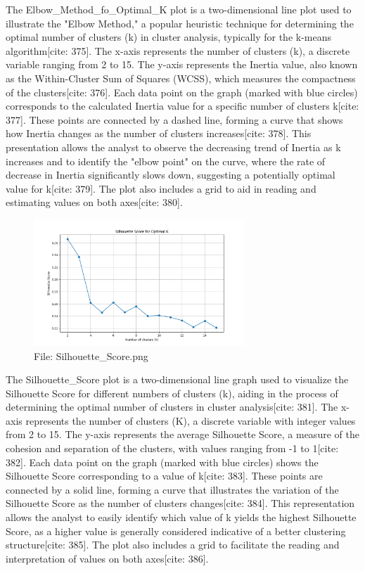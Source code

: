 \documentclass[12pt]{report}
\begin{document}
{{{\begin{figure}[h]
\end{figure}
The Elbow\_Method\_fo\_Optimal\_K plot is a two-dimensional line plot used to illustrate the "Elbow Method," a popular heuristic technique for determining the optimal number of clusters (k) in cluster analysis, typically for the k-means algorithm[cite: 375]. The x-axis represents the number of clusters (k), a discrete variable ranging from 2 to 15. The y-axis represents the Inertia value, also known as the Within-Cluster Sum of Squares (WCSS), which measures the compactness of the clusters[cite: 376]. Each data point on the graph (marked with blue circles) corresponds to the calculated Inertia value for a specific number of clusters k[cite: 377]. These points are connected by a dashed line, forming a curve that shows how Inertia changes as the number of clusters increases[cite: 378]. This presentation allows the analyst to observe the decreasing trend of Inertia as k increases and to identify the "elbow point" on the curve, where the rate of decrease in Inertia significantly slows down, suggesting a potentially optimal value for k[cite: 379]. The plot also includes a grid to aid in reading and estimating values on both axes[cite: 380]. \\
\begin{figure}[h]
    \centering
    \includegraphics[width=300px]{Silhouette_Score.png}
    \caption{File: Silhouette\_Score.png}
    \label{fig:Silhouette}
\end{figure}
The Silhouette\_Score plot is a two-dimensional line graph used to visualize the Silhouette Score for different numbers of clusters (k), aiding in the process of determining the optimal number of clusters in cluster analysis[cite: 381]. The x-axis represents the number of clusters (K), a discrete variable with integer values from 2 to 15. The y-axis represents the average Silhouette Score, a measure of the cohesion and separation of the clusters, with values ranging from -1 to 1[cite: 382]. Each data point on the graph (marked with blue circles) shows the Silhouette Score corresponding to a value of k[cite: 383]. These points are connected by a solid line, forming a curve that illustrates the variation of the Silhouette Score as the number of clusters changes[cite: 384]. This representation allows the analyst to easily identify which value of k yields the highest Silhouette Score, as a higher value is generally considered indicative of a better clustering structure[cite: 385]. The plot also includes a grid to facilitate the reading and interpretation of values on both axes[cite: 386]. \\
}}}
\end{document}

